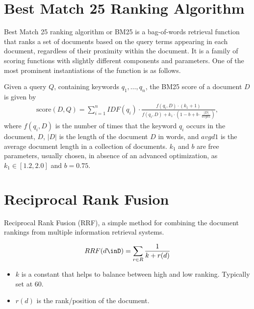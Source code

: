 \section{Best Match 25 Ranking Algorithm}
\label{sec:nlp_bm25}
Best Match 25 ranking algorithm or BM25 is a bag-of-words retrieval function that ranks a set of documents based on the query terms appearing in each document, regardless of their proximity within the document. It is a family of scoring functions with slightly different components and parameters. One of the most prominent instantiations of the function is as follows. 

Given a query $Q$, containing keywords $q_1, \dots, q_n$, the BM25 score of a document $D$ is given by
\begin{align*}
	\text{score}(D,Q)=\sum_{i=1}^n IDF(q_i)\cdot \frac{f(q_i, D)\cdot (k_1+1)}{f(q_i, D)+k_1\cdot (1-b+b\cdot\frac{|D|}{avgd1})},
\end{align*}
where $f(q_i, D)$ is the number of times that the keyword $q_i$ occurs in the document, $D$, $|D|$ is the length of the document $D$ in words, and $avgd1$ is the average document length in a collection of documents. $k_1$ and $b$ are free parameters, usually chosen, in absence of an advanced optimization, as $k_1\in [1.2, 2.0]$ and $b=0.75$.

\section{Reciprocal Rank Fusion }
\label{sec:nlp_rrf}
Reciprocal Rank Fusion (RRF), a simple method for combining the document rankings from multiple information retrieval systems.

\begin{align*}
	RRF(d\inD) = \sum_{r\in R}\frac{1}{k+r(d)}
\end{align*}
\begin{itemize}
	\item $k$ is a constant that helps to balance between high and low ranking. Typically set at 60.
	\item $r(d)$ is the rank/position of the document.
\end{itemize}










